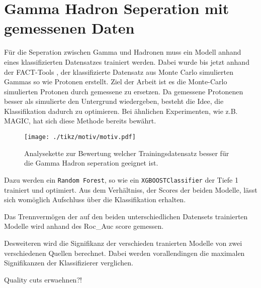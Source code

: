 \chapter{Gamma Hadron Seperation mit gemessenen Daten}
Für die Seperation zwischen Gamma und Hadronen muss ein Modell anhand eines klassifizierten Datensatzes trainiert werden.
Dabei wurde bis jetzt anhand der FACT-Tools \cite{FACT-Tools}, der klassifizierte Datensatz aus Monte Carlo simulierten Gammas so wie Protonen erstellt. 
Ziel der Arbeit ist es die Monte-Carlo simulierten Protonen durch gemessene zu ersetzen.
Da gemessene Protonenen besser als simulierte den Untergrund wiedergeben, besteht die Idee, die Klassifikation dadurch zu optimieren.
Bei ähnlichen Experimenten, wie z.B. MAGIC, hat sich diese Methode bereits bewährt. 
\begin{figure}[H]
  \centering
  \texttt{[image: ./tikz/motiv/motiv.pdf]}
  \caption{Analysekette zur Bewertung welcher Trainingsdatensatz besser für die Gamma Hadron seperation geeignet ist.}
  \label{fig:<+label+>}
\end{figure}
Dazu werden ein \texttt{Random Forest}, so wie ein \texttt{XGBOOSTClassifier} der Tiefe 1 trainiert und optimiert.
Aus dem Verhältniss, der Scores der beiden Modelle, lässt sich womöglich Aufschluss über die Klassifikation erhalten.

Das Trennvermögen der auf den beiden unterschiedlichen Datensets trainierten Modelle wird anhand des Roc\_Auc score gemessen.

Desweiteren wird die Signifikanz der verschieden tranierten Modelle von zwei verschiedenen Quellen berechnet. 
Dabei werden vorallendingen die maximalen Signifikanzen der Klassifizierer verglichen.


Quality cuts erwaehnen?!

